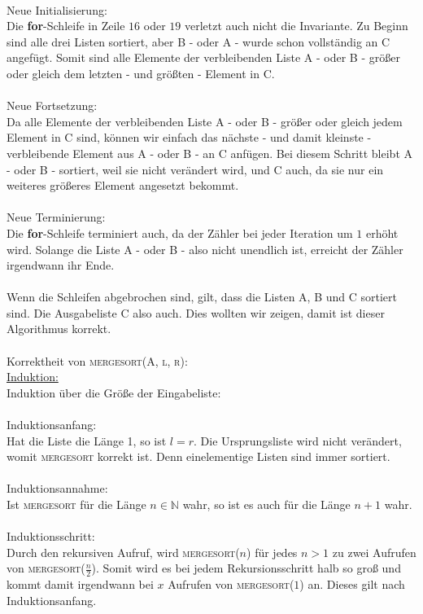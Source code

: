\documentclass{article}
\begin{document}
    \\
    Neue Initialisierung:\\
    Die \textbf{for}-Schleife in Zeile $16$ oder $19$ verletzt auch nicht die Invariante.
    Zu Beginn sind alle drei Listen sortiert, aber B - oder A - wurde schon vollständig an C angefügt.
    Somit sind alle Elemente der verbleibenden Liste A - oder B - größer oder gleich dem letzten - und größten - Element in C.\\
    \\
    Neue Fortsetzung:\\
    Da alle Elemente der verbleibenden Liste A - oder B - größer oder gleich jedem Element in C sind, können wir einfach das nächste - und damit kleinste - verbleibende Element aus A - oder B - an C anfügen.
    Bei diesem Schritt bleibt A - oder B - sortiert, weil sie nicht verändert wird, und C auch, da sie nur ein weiteres größeres Element angesetzt bekommt.\\
    \\
    Neue Terminierung:\\
    Die \textbf{for}-Schleife terminiert auch, da der Zähler bei jeder Iteration um $1$ erhöht wird.
    Solange die Liste A - oder B - also nicht unendlich ist, erreicht der Zähler irgendwann ihr Ende.\\
    \\
    Wenn die Schleifen abgebrochen sind, gilt, dass die Listen A, B und C sortiert sind.
    Die Ausgabeliste C also auch.
    Dies wollten wir zeigen, damit ist dieser Algorithmus korrekt.\\
    \\
    
    Korrektheit von \textsc{mergesort(A, l, r)}:\\
    \underline{Induktion:}\\
    Induktion über die Größe der Eingabeliste:\\
    \\
    Induktionsanfang:\\
    Hat die Liste die Länge 1, so ist $l = r$. Die Ursprungsliste wird nicht verändert, womit \textsc{mergesort} korrekt ist. Denn einelementige Listen sind immer sortiert.\\
    \\
    Induktionsannahme:\\
    Ist \textsc{mergesort} für die Länge $n \in \mathbb{N}$ wahr, so ist es auch für die Länge $n + 1$ wahr.\\
    \\
    Induktionsschritt:\\
    Durch den rekursiven Aufruf, wird \textsc{mergesort($n$)} für jedes $n > 1$ zu zwei Aufrufen von \textsc{mergesort($\frac{n}{2}$)}.
    Somit wird es bei jedem Rekursionsschritt halb so groß und kommt damit irgendwann bei $x$ Aufrufen von \textsc{mergesort($1$)} an.
    Dieses gilt nach Induktionsanfang.
    
\end{document}
